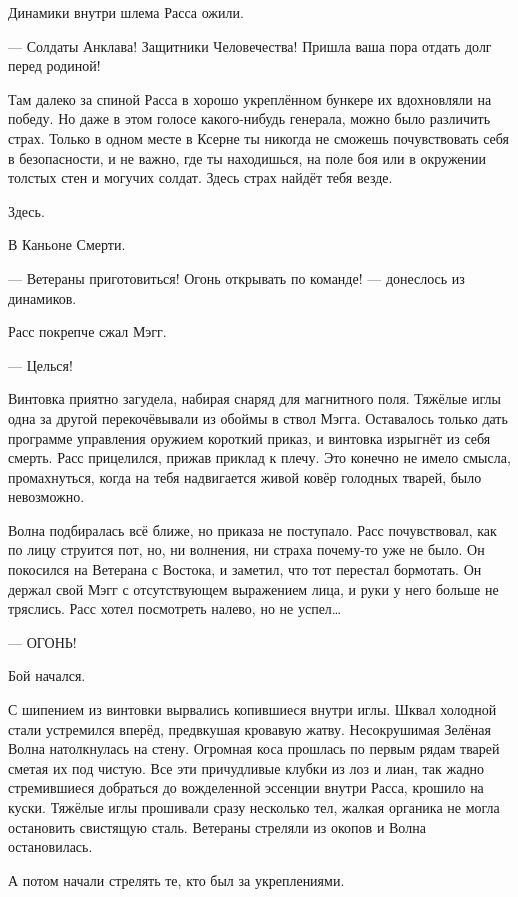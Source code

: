 Динамики внутри шлема Расса ожили.

\noindent --- Солдаты Анклава! Защитники Человечества! Пришла ваша пора отдать 
долг перед родиной!

Там далеко за спиной Расса в хорошо укреплённом бункере их вдохновляли на победу. Но даже в этом голосе какого-нибудь генерала, можно было различить страх. Только в одном месте в Ксерне ты никогда не сможешь почувствовать себя в безопасности, и не важно, где ты находишься, на поле боя или в окружении толстых стен и могучих солдат. Здесь страх найдёт тебя везде.

Здесь.

В Каньоне Смерти.

\noindent --- Ветераны приготовиться! Огонь открывать по команде! --- донеслось 
из динамиков.

Расс покрепче сжал Мэгг.

\noindent --- Целься!

Винтовка приятно загудела, набирая снаряд для магнитного поля. Тяжёлые иглы 
одна за другой перекочёвывали из обоймы в ствол Мэгга. Оставалось только дать 
программе управления оружием короткий приказ, и винтовка изрыгнёт из себя 
смерть. Расс прицелился, прижав приклад к плечу. Это конечно не имело смысла, 
промахнуться, когда на тебя надвигается живой ковёр голодных тварей, было 
невозможно.

Волна подбиралась всё ближе, но приказа не поступало. Расс почувствовал, как по 
лицу струится пот, но, ни волнения, ни страха почему-то уже не было. Он 
покосился на Ветерана с Востока, и заметил, что тот перестал бормотать. Он 
держал свой Мэгг с отсутствующем выражением лица, и руки у него больше не 
тряслись. Расс хотел посмотреть налево, но не успел…

\noindent--- ОГОНЬ!

Бой начался.

С шипением из винтовки вырвались копившиеся внутри иглы. Шквал холодной стали 
устремился вперёд, предвкушая кровавую жатву. Несокрушимая Зелёная Волна 
натолкнулась на стену. Огромная коса прошлась по первым рядам тварей сметая их 
под чистую. Все эти причудливые клубки из лоз и лиан, так жадно стремившиеся 
добраться до вожделенной эссенции внутри Расса, крошило на куски. Тяжёлые иглы 
прошивали сразу несколько тел, жалкая органика не могла остановить свистящую 
сталь. Ветераны стреляли из окопов и Волна остановилась.

А потом начали стрелять те, кто был за укреплениями.

